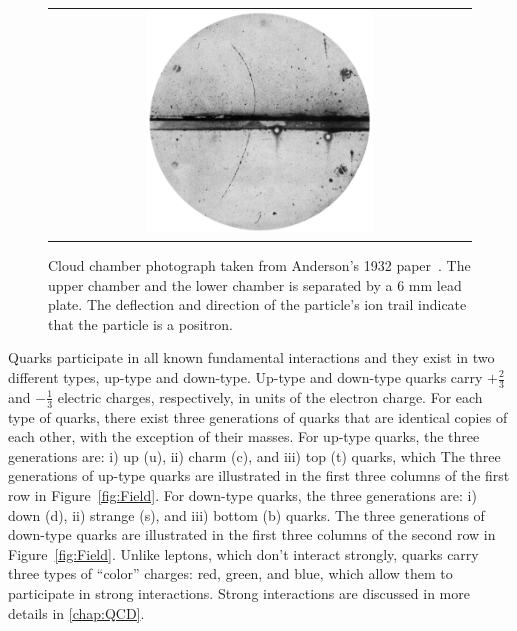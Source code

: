 \begin{figure}[tbh!]
 \begin{center}
 \begin{tabular}{c}
 \includegraphics[width=0.55\textwidth]{figures/Part1/Field/Positron}
 \end{tabular}
 \caption{Cloud chamber photograph taken from Anderson's 1932 paper~\cite{PhysRev.43.491}. The upper chamber and the lower chamber is separated by a 6 mm lead plate. The deflection and direction of the particle's ion trail indicate that the particle is a positron.}
 \label{fig:Positron}
 \end{center}
\end{figure}

Quarks participate in all known fundamental interactions and they exist in two different types, up-type and down-type. Up-type and down-type quarks carry $+\frac{2}{3}$ and $-\frac{1}{3}$ electric charges, respectively, in units of the electron charge. For each type of quarks, there exist three generations of quarks that are identical copies of each other, with the exception of their masses. For up-type quarks, the three generations are: i) up (u), ii) charm (c), and iii) top (t) quarks, which  The three generations of up-type quarks are illustrated in the first three columns of the first row in Figure~\ref{fig:Field}. For down-type quarks, the three generations are: i) down (d), ii) strange (s), and iii) bottom (b) quarks. The three generations of down-type quarks are illustrated in the first three columns of the second row in Figure~\ref{fig:Field}. Unlike leptons, which don't interact strongly, quarks carry three types of ``color'' charges: red, green, and blue, which allow them to participate in strong interactions. Strong interactions are discussed in more details in \autoref{chap:QCD}.

